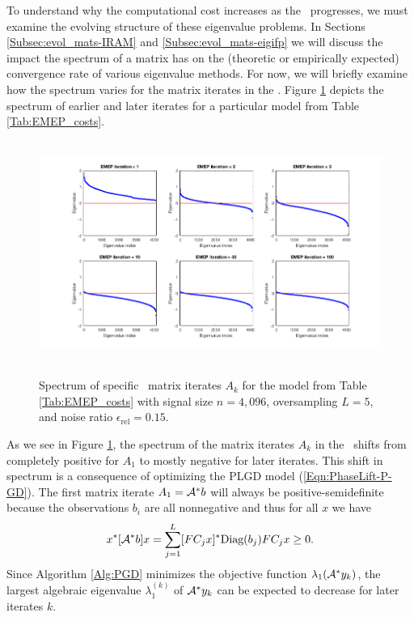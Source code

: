 \begin{enumerate}
To understand why the computational cost increases as the \emep \ progresses, we must examine the evolving structure of these eigenvalue problems.  In Sections \ref{Subsec:evol_mats-IRAM} and \ref{Subsec:evol_mats-eigifp} we will discuss the impact the spectrum of a matrix has on the (theoretic or empirically expected) convergence rate of various eigenvalue methods.  For now, we will briefly examine how the spectrum varies for the matrix iterates in the \emep.  Figure \ref{Fig:EMEP_full_spectrum} depicts the spectrum of earlier and later iterates for a particular model from Table \ref{Tab:EMEP_costs}.



\begin{figure}[H]
\centering
\hbox{\hspace{-1.9cm} \includegraphics[scale=0.6]{EMEP_full_spectrum} }\vspace{-0.4cm}
	\caption{Spectrum of specific \emep \ matrix iterates $A_k$ for the model from Table \ref{Tab:EMEP_costs} with signal size $n = 4,096$, oversampling $L = 5$, and noise ratio $\epsilon_\text{rel} = 0.15$.}
\label{Fig:EMEP_full_spectrum}
\end{figure}

As we see in Figure \ref{Fig:EMEP_full_spectrum}, the spectrum of the matrix iterates $A_k$ in the \emep \ shifts from completely positive for $A_1$ to mostly negative for later iterates.  This shift in spectrum is a consequence of optimizing the PLGD model (\ref{Eqn:PhaseLift-P-GD}).  The first matrix iterate $A_1 = {\mathcal A}^*b$ will always be positive-semidefinite because the observations $b_i$ are all nonnegative and thus for all $x$ we have 
\[
x^*[{\mathcal A}^*b]x 
	= \sum\limits_{\substack{j=1}}^{\substack{L}}
		[FC_jx]^* \textnormal{Diag}(b_j) F C_jx
	\geq 0.
\]
Since Algorithm \ref{Alg:PGD} minimizes the objective function $\lambda_1({\mathcal A}^*y_k)$, the largest algebraic eigenvalue $\lambda_1^{(k)}$ of ${\mathcal A}^*y_k$ can be expected to decrease for later iterates $k$.  



\end{enumerate}
